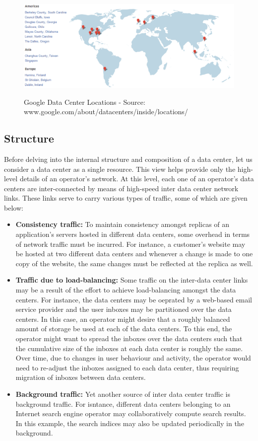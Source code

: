 \begin{figure}
\includegraphics[width=1\textwidth]{pics/googledcmap2.eps}
\label{fig:googledcmap}
\caption{Google Data Center Locations - Source: www.google.com/about/datacenters/inside/locations/}
\end{figure}
\subsection{Structure}
Before delving into the internal structure and composition of a data center, let us consider a data center as a single resource. This view helps provide only the high-level details of an operator's network. At this level, each one of an operator's data centers are inter-connected by means of high-speed inter data center network links. These links serve to carry various types of traffic, some of which are given below:
\begin{itemize}
\item \textbf{Consistency traffic:} To maintain consistency amongst replicas of an application's servers hosted in different data centers, some overhead in terms of network traffic must be incurred. For instance, a customer's website may be hosted at two different data centers and whenever a change is made to one copy of the website, the same changes must be reflected at the replica as well. 
\item \textbf{Traffic due to load-balancing:} Some traffic on the inter-data center links may be a result of the effort to achieve load-balancing amongst the data centers. For instance, the data centers may be oeprated by a web-based email service provider and the user inboxes may be partitioned over the data centers. In this case, an operator might desire that a roughly balanced amount of storage be used at each of the data centers. To this end, the operator might want to spread the inboxes over the data centers such that the cumulative size of the inboxes at each data center is roughly the same. Over time, due to changes in user behaviour and activity, the operator would need to re-adjust the inboxes assigned to each data center, thus requiring migration of inboxes between data centers. 
\item \textbf{Background traffic:} Yet another source of inter data center traffic is background traffic. For isntance, different data centers belonging to an Internet search engine operator may collaboratively compute search results. In this example, the search indices may also be updated periodically in the background.
\end{itemize}

